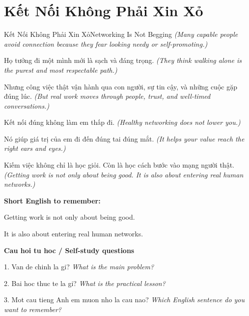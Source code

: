 \section{Kết Nối Không Phải Xin Xỏ}
\begin{truyen}{Kết Nối Không Phải Xin Xỏ}{Networking Is Not Begging}
\textit{(Many capable people avoid connection because they fear looking needy or self-promoting.)}

Họ tưởng đi một mình mới là sạch và đáng trọng.
\textit{(They think walking alone is the purest and most respectable path.)}

Nhưng công việc thật vận hành qua con người, sự tin cậy, và những cuộc gặp đúng lúc.
\textit{(But real work moves through people, trust, and well-timed conversations.)}

Kết nối đúng không làm em thấp đi.
\textit{(Healthy networking does not lower you.)}

Nó giúp giá trị của em đi đến đúng tai đúng mắt.
\textit{(It helps your value reach the right ears and eyes.)}

\end{truyen}

\begin{baihoc}
Kiếm việc không chỉ là học giỏi. Còn là học cách bước vào mạng người thật.
\textit{(Getting work is not only about being good. It is also about entering real human networks.)}
\end{baihoc}

\begin{ghinhoanh}
\textbf{Short English to remember:}

Getting work is not only about being good.

It is also about entering real human networks.

\end{ghinhoanh}

\begin{tuhocnhanh}
\textbf{Cau hoi tu hoc / Self-study questions}

1. Van de chinh la gi? \textit{What is the main problem?}

2. Bai hoc thuc te la gi? \textit{What is the practical lesson?}

3. Mot cau tieng Anh em muon nho la cau nao? \textit{Which English sentence do you want to remember?}
\end{tuhocnhanh}
\ngancach

